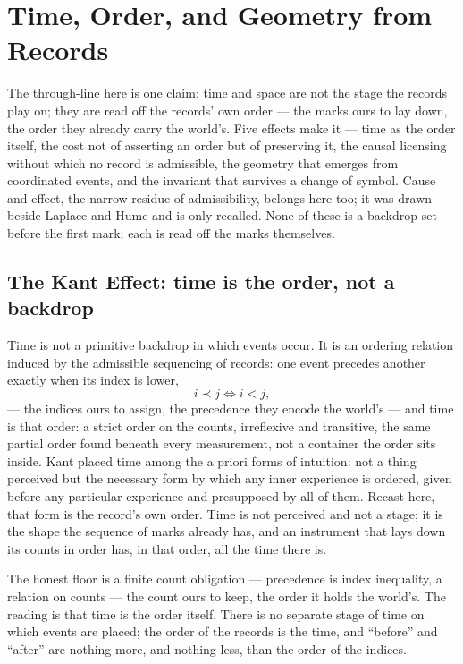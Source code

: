 \chapter{Time, Order, and Geometry from Records}
\label{chap:time-order-geometry}

The through-line here is one claim: time and space are not the stage the records play on; they are
read off the records' own order --- the marks ours to lay down, the order they already carry the world's. Five
effects make it --- time as the order itself, the cost not of asserting
an order but of preserving it, the causal licensing without which no record is admissible, the geometry that
emerges from coordinated events, and the invariant that survives a change of symbol. Cause and effect, the
narrow residue of admissibility, belongs here too; it was drawn beside Laplace and Hume and is only recalled.
None of these is a backdrop set before the first mark; each is read off the marks themselves.

\section{The Kant Effect: time is the order, not a backdrop}
\label{se:kant}

Time is not a primitive backdrop in which events occur. It is an ordering relation induced by the admissible
sequencing of records: one event precedes another exactly when its index is lower,
\begin{equation}
  i \prec j \iff i < j,
\end{equation}
--- the indices ours to assign, the precedence they encode the world's ---
and time is that order: a strict order on the counts, irreflexive and transitive, the same partial order
found beneath every measurement, not a container the order sits inside. Kant placed time
among the a priori forms of intuition: not a thing perceived but the necessary form by which any inner
experience is ordered, given before any particular experience and presupposed by all of them. Recast here, that
form is the record's own order. Time is not perceived and not a stage; it is the shape the sequence of marks
already has, and an instrument that lays down its counts in order has, in that order, all the time there is.

The honest floor is a finite count obligation --- precedence is index inequality, a relation on counts --- the
count ours to keep, the order it holds the world's. The
reading is that time is the order itself. There is no separate stage of time on which events are placed; the
order of the records is the time, and ``before'' and ``after'' are nothing more, and nothing less, than the
order of the indices.

